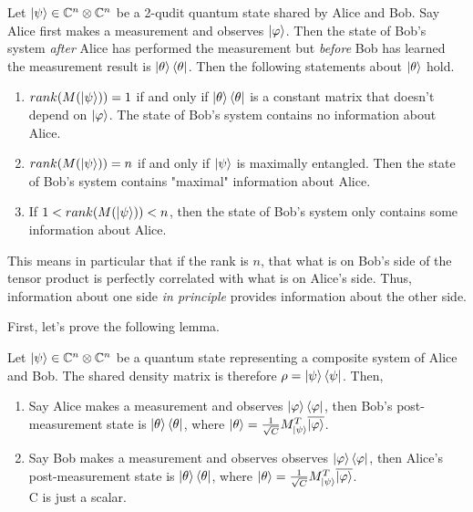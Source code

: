 
\begin{prop}
\label{entanglement-rank}
Let $\ket{\psi} \in \mathbb{C}^n \otimes \mathbb{C}^{n}$ be a 2-qudit quantum state shared by Alice and Bob. Say Alice first makes a measurement and observes $\ket{\varphi}$. Then the state of Bob's system \textit{after} Alice has performed the measurement but \textit{before} Bob has learned the measurement result is $\ket{\theta}\bra{\theta}$. Then the following statements about $\ket{\theta}$ hold.
\begin{enumerate}
    \item $rank(M(\ket{\psi}))=1$ if and only if $\ket{\theta}\bra{\theta}$ is a constant matrix that doesn't depend on $\ket{\varphi}$. The state of Bob's system contains no information about Alice.
    \item $rank(M(\ket{\psi}))=n$ if and only if $\ket{\psi}$ is maximally entangled. Then the state of Bob's system contains "maximal" information about Alice.
    \item If $1<rank(M(\ket{\psi}))<n$, then the state of Bob's system only contains some information about Alice.
\end{enumerate}
\end{prop}

This means in particular that if the rank is $n$, that what is on Bob's side of the tensor product is perfectly correlated with what is on Alice's side.  Thus, information about one side {\emph{in principle}} provides information about the other side. 

First, let's prove the following lemma.




\begin{lemma}
\label{end state lemma}
Let $\ket{\psi} \in \mathbb{C}^n \otimes \mathbb{C}^{n}$ be a quantum state representing a composite system of Alice and Bob.  The shared density matrix is therefore $\rho = \ket{\psi}\bra{\psi}$. Then,
\begin{enumerate}
\item Say Alice makes a measurement and observes $\ket{\varphi}\bra{\varphi}$, then Bob's post-measurement state is $\ket{\theta}\bra{\theta}$, where $\ket{\theta}=\frac{1}{\sqrt{C}}M_{\ket{\psi}}^T \overline{\ket{\varphi}}$.
\item Say Bob makes a measurement and observes observes $\ket{\varphi}\bra{\varphi}$, then Alice's post-measurement state is $\ket{\theta}\bra{\theta}$, where $\ket{\theta}=\frac{1}{\sqrt{C}}M_{\ket{\psi}}^T \overline{\ket{\varphi}}$.\\
C is just a scalar.
\end{enumerate}
\end{lemma}

